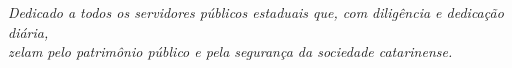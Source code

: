 \begin{dedicatoria}
   \vspace*{\fill}
   \centering
   \noindent
   \textit{Dedicado a todos os servidores públicos estaduais que, com diligência e dedicação diária,\\zelam pelo patrimônio público e pela segurança da sociedade catarinense.} \vspace*{\fill}
\end{dedicatoria}
